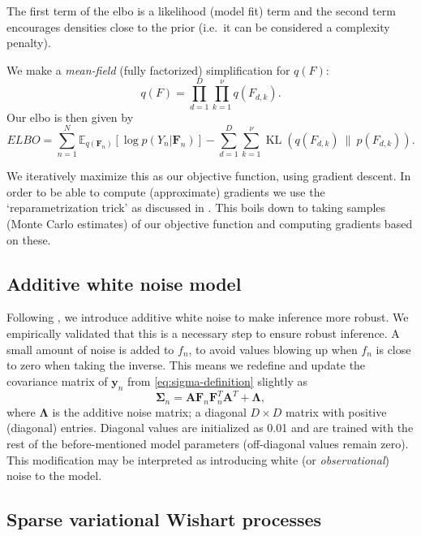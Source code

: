 The first term of the \gls{elbo} is a likelihood (model fit) term and the second term encourages densities close to the prior (i.e.~it can be considered a complexity penalty).

We make a \emph{mean-field} (fully factorized) simplification for $q(F)$:
\begin{equation}
  q(F) = \prod_{d=1}^D \prod_{k=1}^\nu q(F_{d,k}).
\end{equation}
Our \gls{elbo} is then given by
\begin{equation}
  ELBO = \sum^N_{n=1} \mathbb{E}_{q(\mathbf{F}_n)} [\log p(Y_n|\mathbf{F}_n)] - \sum^D_{d=1} \sum^\nu_{k=1} \operatorname{KL}(q(F_{d,k})~\|~p(F_{d,k})).
\end{equation}

We iteratively maximize this as our objective function, using gradient descent.
In order to be able to compute (approximate) gradients we use the `reparametrization trick' as discussed in \textcite{Salimans2013, Kingma2014}.
This boils down to taking samples (Monte Carlo estimates) of our objective function and computing gradients based on these.

\subsection{Additive white noise model}

Following \textcite{Heaukulani2019}, we introduce additive white noise to make inference more robust.
We empirically validated that this is a necessary step to ensure robust inference.
A small amount of noise is added to $f_n$, to avoid values blowing up when $f_n$ is close to zero when taking the inverse.
This means we redefine and update the covariance matrix of $\mathbf{y}_n$ from \cref{eq:sigma-definition} slightly as
\begin{equation}
  \mathbf{\Sigma}_n = \mathbf{A} \mathbf{F}_n \mathbf{F}_n^T \mathbf{A}^T + \mathbf{\Lambda},
\end{equation}
where $\mathbf{\Lambda}$ is the additive noise matrix; a diagonal $D \times D$ matrix with positive (diagonal) entries.
Diagonal values are initialized as 0.01 and are trained with the rest of the before-mentioned model parameters (off-diagonal values remain zero).
This modification may be interpreted as introducing white (or \emph{observational}) noise to the model.

\subsection{Sparse variational Wishart processes}
\label{subsec:svwp}

